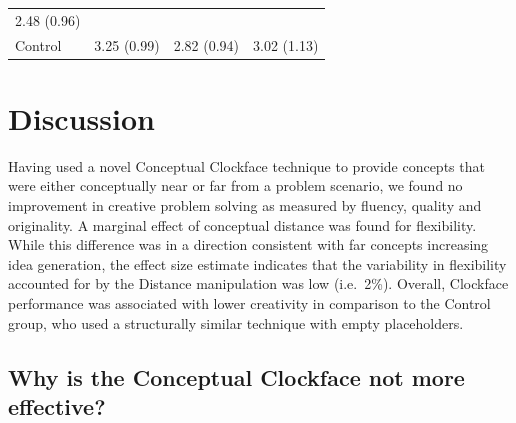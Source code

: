 \documentclass[english,man]{apa6}
\begin{document}
\begin{longtable}[]{@{}llll@{}}
\begin{minipage}[t]{0.26\columnwidth}
2.48 (0.96)\strut
\end{minipage}\tabularnewline
\begin{minipage}[t]{0.10\columnwidth}\raggedright
Control\strut
\end{minipage} & \begin{minipage}[t]{0.28\columnwidth}\raggedright
3.25 (0.99)\strut
\end{minipage} & \begin{minipage}[t]{0.24\columnwidth}\raggedright
2.82 (0.94)\strut
\end{minipage} & \begin{minipage}[t]{0.26\columnwidth}\raggedright
3.02 (1.13)\strut
\end{minipage}\tabularnewline
\bottomrule
\end{longtable}

\hypertarget{discussion}{%
\section{Discussion}\label{discussion}}

Having used a novel Conceptual Clockface technique to provide concepts
that were either conceptually near or far from a problem scenario, we
found no improvement in creative problem solving as measured by fluency,
quality and originality. A marginal effect of conceptual distance was
found for flexibility. While this difference was in a direction
consistent with far concepts increasing idea generation, the effect size
estimate indicates that the variability in flexibility accounted for by
the Distance manipulation was low (i.e.~2\%). Overall, Clockface
performance was associated with lower creativity in comparison to the
Control group, who used a structurally similar technique with empty
placeholders.

\hypertarget{why-is-the-conceptual-clockface-not-more-effective}{%
\subsection{Why is the Conceptual Clockface not more
effective?}\label{why-is-the-conceptual-clockface-not-more-effective}}
\end{document}

